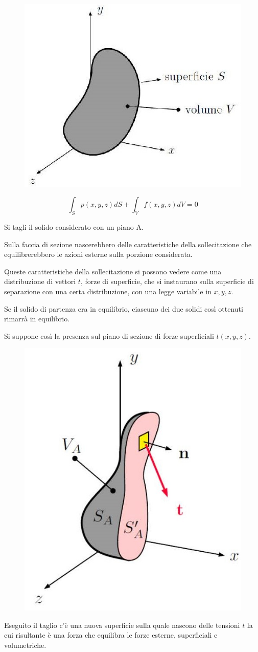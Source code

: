 \documentclass{article}
\begin{document}
\begin{adjustwidth}{2in}{}
\begin{figure}[H]
	\centering
	\includegraphics[width=0.3\linewidth]{immagini/1.PARTE7_Pagina_02}
\end{figure}

	\[ \int_{S}p(x,y,z)dS + \int_{V}f(x,y,z)dV = 0  \]

	Si tagli il solido considerato con un piano A. \newline 
	
	Sulla faccia di sezione nascerebbero delle caratteristiche della sollecitazione che equilibrerebbero le azioni esterne sulla porzione considerata. 
	
	Queste caratteristiche della sollecitazione si possono vedere come una distribuzione di vettori $t$, forze di superficie, che si instaurano sulla superficie di separazione con una certa distribuzione, con una legge variabile in $x,y,z$. \newline 
	
	Se il solido di partenza era in equilibrio, ciascuno dei due solidi così ottenuti rimarrà in equilibrio.\newline
	
	Si suppone così la presenza sul piano di
	sezione di forze superficiali $ t(x,y,z) $.

\begin{figure}[H]
	\centering
	\includegraphics[width=0.3\linewidth]{immagini/1.PARTE7_Pagina_03}
\end{figure}
	Eseguito il taglio c'è una nuova superficie sulla quale nascono delle tensioni $t$ la cui risultante è una forza che equilibra le forze esterne, superficiali e volumetriche. \newline
	

\end{adjustwidth}
\end{document}
